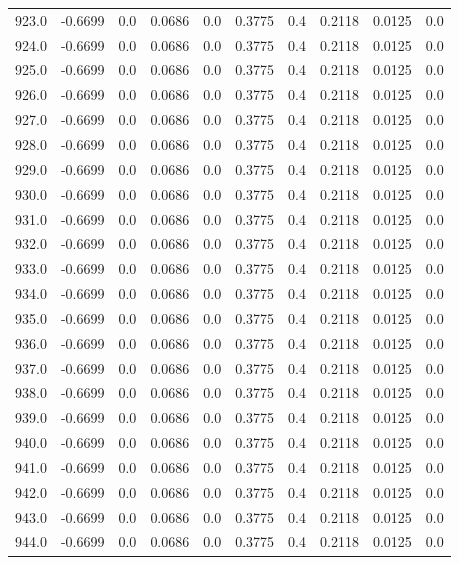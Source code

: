 \begin{longtable}{lrrrrrrrrr}
923.0 & -0.6699 & 0.0 & 0.0686 & 0.0 & 0.3775 & 0.4 & 0.2118 & 0.0125 & 0.0 \\
924.0 & -0.6699 & 0.0 & 0.0686 & 0.0 & 0.3775 & 0.4 & 0.2118 & 0.0125 & 0.0 \\
925.0 & -0.6699 & 0.0 & 0.0686 & 0.0 & 0.3775 & 0.4 & 0.2118 & 0.0125 & 0.0 \\
926.0 & -0.6699 & 0.0 & 0.0686 & 0.0 & 0.3775 & 0.4 & 0.2118 & 0.0125 & 0.0 \\
927.0 & -0.6699 & 0.0 & 0.0686 & 0.0 & 0.3775 & 0.4 & 0.2118 & 0.0125 & 0.0 \\
928.0 & -0.6699 & 0.0 & 0.0686 & 0.0 & 0.3775 & 0.4 & 0.2118 & 0.0125 & 0.0 \\
929.0 & -0.6699 & 0.0 & 0.0686 & 0.0 & 0.3775 & 0.4 & 0.2118 & 0.0125 & 0.0 \\
930.0 & -0.6699 & 0.0 & 0.0686 & 0.0 & 0.3775 & 0.4 & 0.2118 & 0.0125 & 0.0 \\
931.0 & -0.6699 & 0.0 & 0.0686 & 0.0 & 0.3775 & 0.4 & 0.2118 & 0.0125 & 0.0 \\
932.0 & -0.6699 & 0.0 & 0.0686 & 0.0 & 0.3775 & 0.4 & 0.2118 & 0.0125 & 0.0 \\
933.0 & -0.6699 & 0.0 & 0.0686 & 0.0 & 0.3775 & 0.4 & 0.2118 & 0.0125 & 0.0 \\
934.0 & -0.6699 & 0.0 & 0.0686 & 0.0 & 0.3775 & 0.4 & 0.2118 & 0.0125 & 0.0 \\
935.0 & -0.6699 & 0.0 & 0.0686 & 0.0 & 0.3775 & 0.4 & 0.2118 & 0.0125 & 0.0 \\
936.0 & -0.6699 & 0.0 & 0.0686 & 0.0 & 0.3775 & 0.4 & 0.2118 & 0.0125 & 0.0 \\
937.0 & -0.6699 & 0.0 & 0.0686 & 0.0 & 0.3775 & 0.4 & 0.2118 & 0.0125 & 0.0 \\
938.0 & -0.6699 & 0.0 & 0.0686 & 0.0 & 0.3775 & 0.4 & 0.2118 & 0.0125 & 0.0 \\
939.0 & -0.6699 & 0.0 & 0.0686 & 0.0 & 0.3775 & 0.4 & 0.2118 & 0.0125 & 0.0 \\
940.0 & -0.6699 & 0.0 & 0.0686 & 0.0 & 0.3775 & 0.4 & 0.2118 & 0.0125 & 0.0 \\
941.0 & -0.6699 & 0.0 & 0.0686 & 0.0 & 0.3775 & 0.4 & 0.2118 & 0.0125 & 0.0 \\
942.0 & -0.6699 & 0.0 & 0.0686 & 0.0 & 0.3775 & 0.4 & 0.2118 & 0.0125 & 0.0 \\
943.0 & -0.6699 & 0.0 & 0.0686 & 0.0 & 0.3775 & 0.4 & 0.2118 & 0.0125 & 0.0 \\
944.0 & -0.6699 & 0.0 & 0.0686 & 0.0 & 0.3775 & 0.4 & 0.2118 & 0.0125 & 0.0 \\

\end{longtable}
